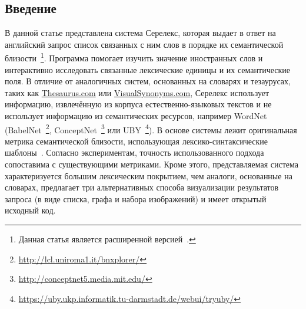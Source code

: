 \documentclass[a4paper,10pt,twoside]{article}
\begin{document}

\author{Панченко А.И.${}^{1,2}$, Романов П.В.${}^2$, Романов А.В${}^1$, \linebreak Филиппович А.Ю.${}^2$, Филиппович Ю.Н.${}^2$, Морозова О.И.${}^1$}



\subsection{Введение}

В данной статье представлена система Серелекс, которая выдает в ответ на английский запрос список связанных с ним слов в порядке их семантической близости~\footnote{Данная статья является расширенной версией~\cite{panchenko2013serelex}.}. Программа помогает изучить значение иностранных слов и интерактивно исследовать связанные лексические единицы и их семантические поля. В отличие от аналогичных систем, основанных на словарях и тезаурусах, таких как \url{Thesaurus.com} или \url{VisualSynonyms.com}, Серелекс использует информацию, извлечённую из корпуса естественно-языковых текстов и не использует информацию из семантических ресурсов, например WordNet (BabelNet~\footnote{ \url{http://lcl.uniroma1.it/bnxplorer/}}, ConceptNet~\footnote{ \url{http://conceptnet5.media.mit.edu/}} или UBY~\footnote{\url{https://uby.ukp.informatik.tu-darmstadt.de/webui/tryuby/}}). В основе системы лежит оригинальная метрика семантической близости, использующая лексико-синтаксические шаблоны~\cite{panchenko2012konvens}. Согласно экспериментам, точность использованного подхода сопоставима с существующими метриками. Кроме этого, представляемая система характеризуется большим лексическим покрытием, чем аналоги, основанные на словарах, предлагает три альтернативных способа визуализации результатов запроса (в виде списка, графа и набора изображений) и имеет открытый исходный код.
\end{document}
